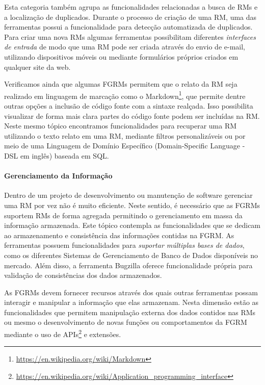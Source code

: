 Esta categoria também agrupa as funcionalidades relacionadas a busca de RMs e a
localização de duplicados. Durante o processo de criação de uma RM, uma das
ferramentas possui a funcionalidade para detecção automatizada de duplicados.
Para criar uma nova RMs algumas ferramentas possibilitam diferentes
\textit{interfaces de entrada} de modo que uma RM pode ser criada através do
envio de e-mail, utilizando dispositivos móveis ou mediante formulários próprios
criados em qualquer site da web.

Verificamos ainda que algumas FGRMs permitem que o relato da RM seja realizado
em linguagem de marcação como o
Markdown\footnote{\url{https://en.wikipedia.org/wiki/Markdown}}, que permite
dentre outras opções a inclusão de código fonte com a sintaxe realçada. Isso
possibilita visualizar de forma mais clara partes do código fonte podem ser
incluídas na RM\@. Neste mesmo tópico encontramos funcionalidades para recuperar
uma RM utilizando o texto relato em uma RM, mediante filtros personalizáveis ou
por meio de uma Linguagem de Domínio Específico (Domain-Specific Language \@-\@
DSL em inglês) baseada em SQL\@.

\paragraph{Gerenciamento da Informação}
\label{par:gerenciamento_da_informação}

Dentro de um projeto de desenvolvimento ou manutenção de software gerenciar uma
RM por vez não é muito eficiente. Neste sentido, é necessário que as FGRMs
suportem RMs de forma agregada permitindo o gerenciamento em massa da
informação armazenada. Este tópico contempla as funcionalidades que se dedicam
ao armazenamento e consistência das informações contidas na FGRM\@. As ferramentas
possuem funcionalidades para \textit{suportar múltiplas bases de dados}, como os
diferentes Sistemas de Gerenciamento de Banco de Dados disponíveis no mercado.
Além disso, a ferramenta Bugzilla oferece funcionalidade própria para validação
de consistências dos dados armazenados.

As FGRMs devem fornecer recursos através dos quais outras ferramentas possam
interagir e manipular a informação que elas armazenam. Nesta dimensão estão as
funcionalidades que permitem manipulação externa dos dados contidos nas RMs ou
mesmo o desenvolvimento de novas funções ou comportamentos da FGRM mediante o
uso de
APIs\footnote{\url{https://en.wikipedia.org/wiki/Application_programming_interface}}
e extensões.

